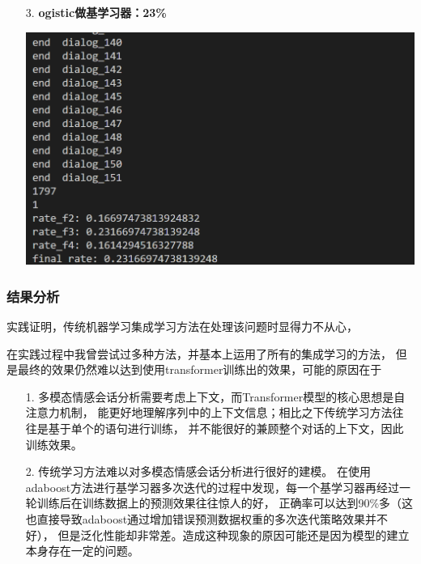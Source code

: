\documentclass[11pt]{article}
\begin{document}
\begin{enumerate}
                \item [3. ]\textbf{ogistic做基学习器：23\%}
                \begin{center}
                    \includegraphics[scale=1]{graph/result3.png}
                \end{center}
            \end{enumerate}

            \subsubsection{结果分析}
            实践证明，传统机器学习集成学习方法在处理该问题时显得力不从心，
            
            在实践过程中我曾尝试过多种方法，并基本上运用了所有的集成学习的方法，
            但是最终的效果仍然难以达到使用transformer训练出的效果，可能的原因在于
            
            \begin{enumerate}
                \item [1. ]多模态情感会话分析需要考虑上下文，而Transformer模型的核心思想是自注意力机制，
                            能更好地理解序列中的上下文信息；相比之下传统学习方法往往是基于单个的语句进行训练，
                            并不能很好的兼顾整个对话的上下文，因此训练效果。

                \item [2. ]传统学习方法难以对多模态情感会话分析进行很好的建模。
                            在使用adaboost方法进行基学习器多次迭代的过程中发现，每一个基学习器再经过一轮训练后在训练数据上的预测效果往往惊人的好，
                            正确率可以达到90\%多（这也直接导致adaboost通过增加错误预测数据权重的多次迭代策略效果并不好），
                            但是泛化性能却非常差。造成这种现象的原因可能还是因为模型的建立本身存在一定的问题。
            \end{enumerate}
\end{document}
